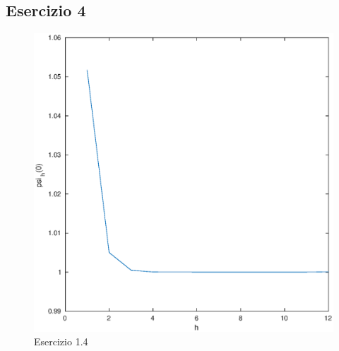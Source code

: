 \documentclass[11pt]{extarticle}
\begin{document}
\subsection{Esercizio 4}
\begin{figure}[h]
\caption{Esercizio 1.4}
\label{fes1.4}
\includegraphics[width=\textwidth]{plot/fes4.eps}
\end{figure}
\end{document}
